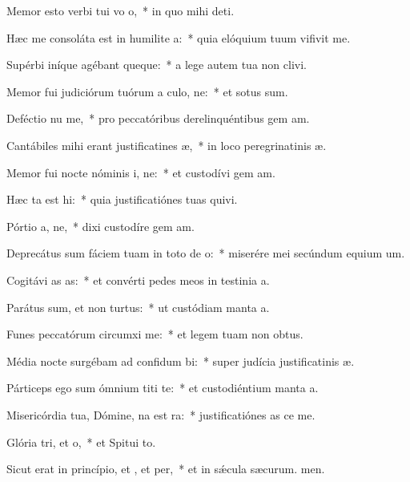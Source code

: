 \item Memor esto verbi tui vo o,~* in quo mihi  deti.
\item Hæc me consoláta est in humilite a:~* quia elóquium tuum vifivit me.
\item Supérbi iníque agébant queque:~* a lege autem tua non clivi.
\item Memor fui judiciórum tuórum a culo, ne:~* et sotus sum.
\item Deféctio nu me,~* pro peccatóribus derelinquéntibus gem am.
\item Cantábiles mihi erant justificatines æ,~* in loco peregrinatinis æ.
\item Memor fui nocte nóminis i, ne:~* et custodívi gem am.
\item Hæc ta est hi:~* quia justificatiónes tuas quivi.
\item Pórtio a, ne,~* dixi custodíre gem am.
\item Deprecátus sum fáciem tuam in toto de o:~* miserére mei secúndum equium um.
\item Cogitávi as as:~* et convérti pedes meos in testinia a.
\item Parátus sum, et non  turtus:~* ut custódiam manta a.
\item Funes peccatórum circumxi  me:~* et legem tuam non  obtus.
\item Média nocte surgébam ad confidum bi:~* super judícia justificatinis æ.
\item Párticeps ego sum ómnium titi te:~* et custodiéntium manta a.
\item Misericórdia tua, Dómine, na est ra:~* justificatiónes as ce me.
\item Glória tri, et o,~* et Spitui to.
\item Sicut erat in princípio, et , et per,~* et in sǽcula sæcurum. men.
